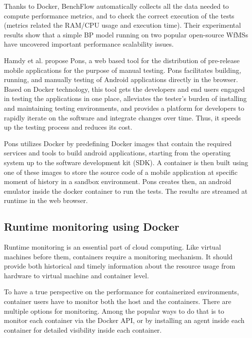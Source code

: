 Thanks to Docker, BenchFlow automatically collects all the data needed to compute performance metrics, and to check the correct execution of the tests (metrics related the RAM/CPU usage and execution time).
Their experimental results show that a simple BP model running on two popular
open-source WfMSs have uncovered important performance scalability issues. 

Hamdy et al.\cite{hamdy2016web} propose Pons, a web based tool for the distribution of pre-release mobile
applications for the purpose of manual testing. Pons facilitates building, running, and manually testing of Android applications directly in the browser. 
Based on Docker technology, this tool gets the developers and end users engaged in testing the applications in one
place, alleviates the tester's burden of installing and maintaining testing environments, and provides a platform for developers to rapidly iterate on the software and integrate changes over time. Thus, it speeds up the testing process and reduces its cost.

Pons utilizes Docker by predefining Docker images that
contain the required services and tools to build android
applications, starting from the operating system up to the
software development kit (SDK). A container is then built using one of these images to store the source code of
a mobile application at specific moment of history in a
sandbox environment. Pons creates then, an android emulator inside the docker container to run the tests. The results are streamed at runtime in the web browser.

\subsection{Runtime monitoring using Docker} 

 

Runtime monitoring is an essential part of cloud computing\cite{aceto2013cloud}. Like virtual machines before them, containers require a monitoring mechanism. It should provide both historical and timely information about the resource usage from hardware to virtual machine and container level.


To have a true perspective on the performance for containerized environments, container users have to monitor both the host and the containers. There are multiple options for monitoring. 
Among the popular ways to do that is to monitor each container via the Docker API, or by installing an agent inside each container for detailed visibility inside each container. 

